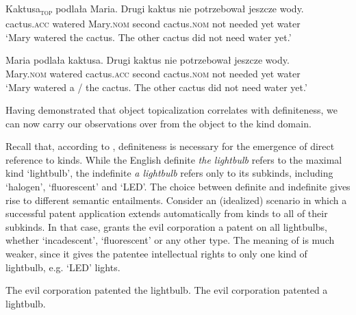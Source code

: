 \documentclass[output=paper]{langscibook}
\begin{document}
\ea \label{ex:cactus}
\ea \gll
Kaktusa\textsubscript{\textsc{top}} podlała Maria. \minsp{\#} Drugi kaktus nie potrzebował jeszcze wody.\\
cactus.\textsc{acc} watered Mary.\textsc{nom} {} second cactus.\textsc{nom} not needed yet water\\

\glt `Mary watered the cactus. The other cactus did not need water yet.' \label{ex:cactus_1}

\ex \gll
Maria podlała kaktusa. Drugi kaktus nie potrzebował jeszcze wody.\\
Mary.\textsc{nom} watered cactus.\textsc{acc} second cactus.\textsc{nom} not needed yet water\\

\glt `Mary watered a / the cactus. The other cactus did not need water yet.'\\ \label{ex:cactus_2}

\z\z

\noindent
Having demonstrated that object topicalization correlates with definiteness, we can now carry our observations over from the object to the kind domain.

Recall that, according to \citet{Borik.Espinal2012, Borik.Espinal2015}, definiteness is necessary for the emergence of direct reference to kinds. While the English definite \textit{the lightbulb} refers to the maximal kind `lightbulb', the indefinite \textit{a lightbulb} refers only to its subkinds, including `halogen', `fluorescent' and `LED'. The choice between definite and indefinite gives rise to different semantic entailments. Consider an (idealized) scenario in which a successful patent application extends automatically from kinds to all of their subkinds. In that case,  grants the evil corporation a patent on all lightbulbs, whether `incadescent', `fluorescent' or any other type. The meaning of  is much weaker, since it gives the patentee intellectual rights to only one kind of lightbulb, e.g. `LED' lights.

\ea \label{ex:lightbulb_eng}
\ea The evil corporation patented the lightbulb. \label{ex:lightbulb_eng_1}
\ex The evil corporation patented a lightbulb.\label{ex:lightbulb_eng_2}
\z \z
\end{document}
